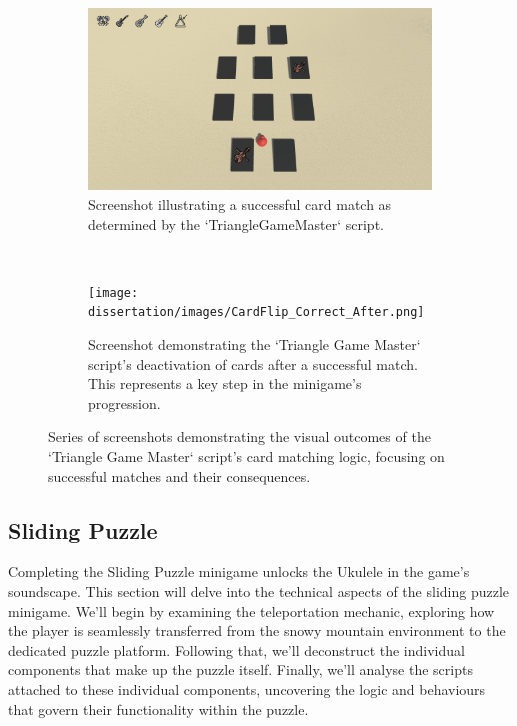 \documentclass{l4proj}
\begin{document}
\begin{figure}[h]
  \centering
 \begin{subfigure}[t]{0.45\textwidth}
  \includegraphics[width=\textwidth]{dissertation/images/CardFlip_Correct_Mid.png}
  \caption{Screenshot illustrating a successful card match as determined by the `TriangleGameMaster` script.}
  \label{fig:card_match}
 \end{subfigure}
 ~
 \begin{subfigure}[t]{0.45\textwidth}
  \texttt{[image: dissertation/images/CardFlip\_Correct\_After.png]}
  \caption{Screenshot demonstrating the `Triangle Game Master` script's deactivation of cards after a successful match. This represents a key step in the minigame's progression.}
  \label{fig:card_deactivation}
 \end{subfigure}  

 \caption{Series of screenshots demonstrating the visual outcomes of the `Triangle Game Master` script's card matching logic, focusing on successful matches and their consequences.}  

 \label{fig:card_matching_success} 
\end{figure}

\subsection{Sliding Puzzle}
Completing the Sliding Puzzle minigame unlocks the Ukulele in the game's soundscape. This section will delve into the technical aspects of the sliding puzzle minigame. We'll begin by examining the teleportation mechanic, exploring how the player is seamlessly transferred from the snowy mountain environment to the dedicated puzzle platform. Following that, we'll deconstruct the individual components that make up the puzzle itself. Finally, we'll analyse the scripts attached to these individual components, uncovering the logic and behaviours that govern their functionality within the puzzle.
\end{document}
